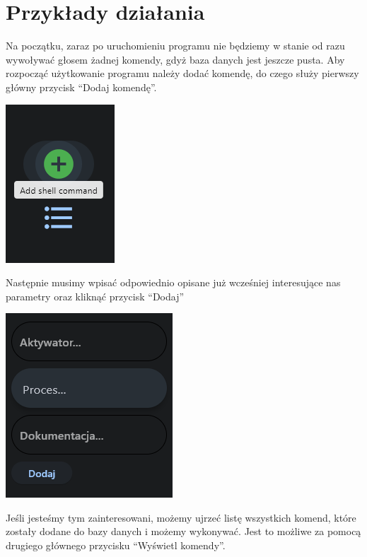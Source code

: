 \documentclass[polish]{article}
\begin{document}
    \section{Przykłady działania}

        Na początku, zaraz po uruchomieniu programu nie będziemy w stanie od razu wywoływać głosem żadnej komendy, gdyż baza danych jest jeszcze pusta. Aby rozpocząć użytkowanie programu należy dodać komendę, do czego służy pierwszy główny przycisk ``Dodaj komendę''.

        \begin{center}

          \includegraphics[scale=1.0]{screen2.png}

        \end{center}

        Następnie musimy wpisać odpowiednio opisane już wcześniej interesujące nas parametry oraz kliknąć przycisk ``Dodaj''

        \begin{center}

          \includegraphics[scale=1.0]{screen3.png}

        \end{center}

        Jeśli jesteśmy tym zainteresowani, możemy ujrzeć listę wszystkich komend, które zostały dodane do bazy danych i możemy wykonywać. Jest to możliwe za pomocą drugiego głównego przycisku ``Wyświetl komendy''.
\end{document}
